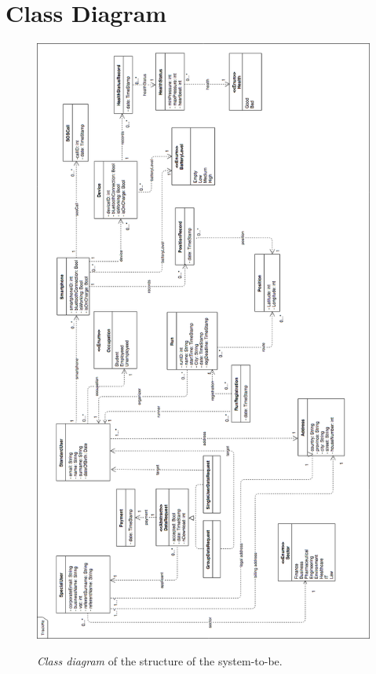 \section{Class Diagram}
\begin{figure}[H]
  \begin{center}
  	\includegraphics[width=\textwidth,height=0.58\paperheight,keepaspectratio]{./img/Class_Diagram.png}
		\caption{\textit{Class diagram} of the structure of the system-to-be.}
    \hspace{0.05\linewidth}
    \centering
		\label{img:classDiagram}
    \end{center}
\end{figure}
